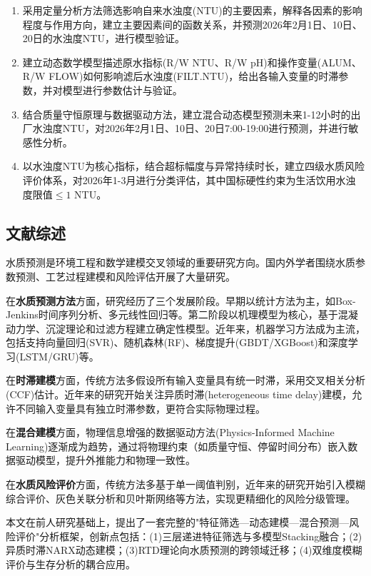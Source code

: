 \documentclass[12pt,a4paper]{ctexart}
\begin{document}
\begin{enumerate}
    \item 采用定量分析方法筛选影响自来水浊度(NTU)的主要因素，解释各因素的影响程度与作用方向，建立主要因素间的函数关系，并预测2026年2月1日、10日、20日的水浊度NTU，进行模型验证。
    \item 建立动态数学模型描述原水指标(R/W NTU、R/W pH)和操作变量(ALUM、R/W FLOW)如何影响滤后水浊度(FILT.NTU)，给出各输入变量的时滞参数，并对模型进行参数估计与验证。
    \item 结合质量守恒原理与数据驱动方法，建立混合动态模型预测未来1-12小时的出厂水浊度NTU，对2026年2月1日、10日、20日7:00-19:00进行预测，并进行敏感性分析。
    \item 以水浊度NTU为核心指标，结合超标幅度与异常持续时长，建立四级水质风险评价体系，对2026年1-3月进行分类评估，其中国标硬性约束为生活饮用水浊度限值$\leq 1$ NTU。
\end{enumerate}

\subsection{文献综述}

水质预测是环境工程和数学建模交叉领域的重要研究方向。国内外学者围绕水质参数预测、工艺过程建模和风险评估开展了大量研究。

在\textbf{水质预测方法}方面，研究经历了三个发展阶段。早期以统计方法为主，如Box-Jenkins时间序列分析、多元线性回归等。第二阶段以机理模型为核心，基于混凝动力学、沉淀理论和过滤方程建立确定性模型。近年来，机器学习方法成为主流，包括支持向量回归(SVR)、随机森林(RF)、梯度提升(GBDT/XGBoost)和深度学习(LSTM/GRU)等。

在\textbf{时滞建模}方面，传统方法多假设所有输入变量具有统一时滞，采用交叉相关分析(CCF)估计。近年来的研究开始关注异质时滞(heterogeneous time delay)建模，允许不同输入变量具有独立时滞参数，更符合实际物理过程。

在\textbf{混合建模}方面，物理信息增强的数据驱动方法(Physics-Informed Machine Learning)逐渐成为趋势，通过将物理约束（如质量守恒、停留时间分布）嵌入数据驱动模型，提升外推能力和物理一致性。

在\textbf{水质风险评价}方面，传统方法多基于单一阈值判别，近年来的研究开始引入模糊综合评价、灰色关联分析和贝叶斯网络等方法，实现更精细化的风险分级管理。

本文在前人研究基础上，提出了一套完整的"特征筛选—动态建模—混合预测—风险评价"分析框架，创新点包括：(1)三层递进特征筛选与多模型Stacking融合；(2)异质时滞NARX动态建模；(3)RTD理论向水质预测的跨领域迁移；(4)双维度模糊评价与生存分析的耦合应用。
\end{document}

